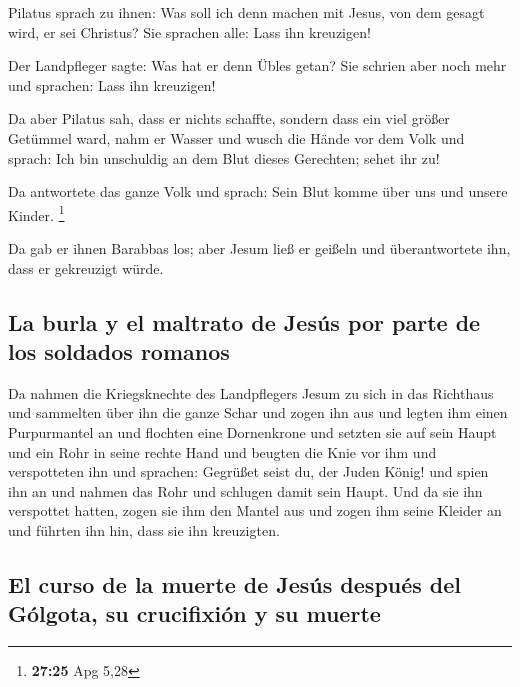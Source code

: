  Pilatus sprach zu ihnen: Was soll ich denn machen mit
Jesus, von dem gesagt wird, er sei Christus? Sie sprachen alle: Lass ihn
kreuzigen!

 Der Landpfleger sagte: Was hat er denn Übles getan? Sie
schrien aber noch mehr und sprachen: Lass ihn kreuzigen!

 Da aber Pilatus sah, dass er nichts schaffte, sondern
dass ein viel größer Getümmel ward, nahm er Wasser und wusch die Hände
vor dem Volk und sprach: Ich bin unschuldig an dem Blut dieses
Gerechten; sehet ihr zu!

 Da antwortete das ganze Volk und sprach: Sein Blut komme
über uns und unsere Kinder. \footnote{\textbf{27:25} Apg 5,28}

 Da gab er ihnen Barabbas los; aber Jesum ließ er geißeln
und überantwortete ihn, dass er gekreuzigt würde.

\hypertarget{la-burla-y-el-maltrato-de-jesuxfas-por-parte-de-los-soldados-romanos}{%
\subsection{La burla y el maltrato de Jesús por parte de los soldados
romanos}\label{la-burla-y-el-maltrato-de-jesuxfas-por-parte-de-los-soldados-romanos}}

 Da nahmen die Kriegsknechte des Landpflegers Jesum zu
sich in das Richthaus und sammelten über ihn die ganze Schar
 und zogen ihn aus und legten ihm einen Purpurmantel an
 und flochten eine Dornenkrone und setzten sie auf sein
Haupt und ein Rohr in seine rechte Hand und beugten die Knie vor ihm und
verspotteten ihn und sprachen: Gegrüßet seist du, der Juden König!
 und spien ihn an und nahmen das Rohr und schlugen damit
sein Haupt.  Und da sie ihn verspottet hatten, zogen sie
ihm den Mantel aus und zogen ihm seine Kleider an und führten ihn hin,
dass sie ihn kreuzigten.

\hypertarget{el-curso-de-la-muerte-de-jesuxfas-despuuxe9s-del-guxf3lgota-su-crucifixiuxf3n-y-su-muerte}{%
\subsection{El curso de la muerte de Jesús después del Gólgota, su
crucifixión y su
muerte}\label{el-curso-de-la-muerte-de-jesuxfas-despuuxe9s-del-guxf3lgota-su-crucifixiuxf3n-y-su-muerte}}

